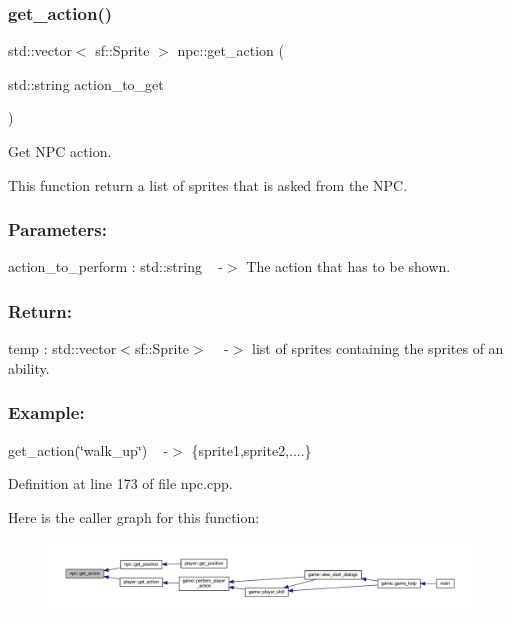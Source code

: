 \subsubsection{\texorpdfstring{get\+\_\+action()}{get\_action()}}
{\footnotesize\ttfamily std\+::vector$<$ sf\+::\+Sprite $>$ npc\+::get\+\_\+action (\begin{DoxyParamCaption}\item[{std\+::string}]{action\+\_\+to\+\_\+get }\end{DoxyParamCaption})}



Get N\+PC action. 

This function return a list of sprites that is asked from the N\+PC. ~\newline


\subsubsection*{Parameters\+: }

action\+\_\+to\+\_\+perform \+: std\+::string ~\newline
-\/$>$ The action that has to be shown.

\subsubsection*{Return\+: }

temp \+: std\+::vector$<$sf\+::\+Sprite$>$ ~\newline
-\/$>$ list of sprites containing the sprites of an ability.

\subsubsection*{Example\+: }

get\+\_\+action(\char`\"{}walk\+\_\+up\char`\"{}) ~\newline
-\/$>$ \{sprite1,sprite2,....\} 

Definition at line 173 of file npc.\+cpp.

Here is the caller graph for this function\+:
\nopagebreak
\begin{figure}[H]
\begin{center}
\leavevmode
\includegraphics[width=350pt]{classnpc_a78bc2f0af05b44a6a8e71fa3853c0920_icgraph}
\end{center}
\end{figure}
\mbox{\label{classnpc_aa6a71f7355403e4a108f3c4e8b6a3931}} 

